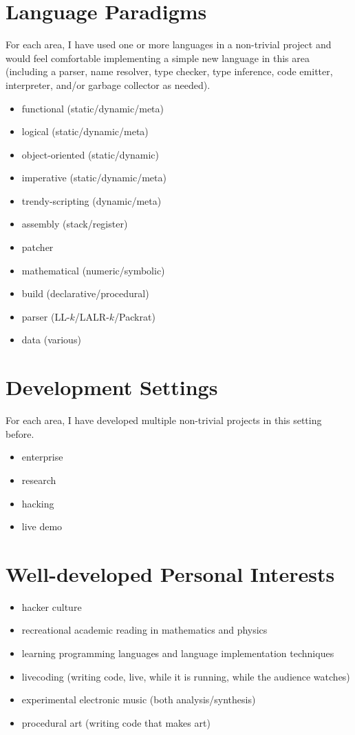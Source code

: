 \documentclass[12pt]{article}
\begin{document}
\section*{Language Paradigms}
For each area, I have used one or more languages in a non-trivial project and
would feel comfortable implementing a simple new language in this area
(including a parser, name resolver, type checker, type inference, code
emitter, interpreter, and/or garbage collector as needed).

\begin{itemize}
  \item functional (static/dynamic/meta) 
  \item logical (static/dynamic/meta)
  \item object-oriented (static/dynamic)
  \item imperative (static/dynamic/meta)
  \item trendy-scripting (dynamic/meta)
  \item assembly (stack/register)
  \item patcher
  \item mathematical (numeric/symbolic)
  \item build (declarative/procedural)
  \item parser (LL-$k$/LALR-$k$/Packrat)
  \item data (various)
\end{itemize}

\section*{Development Settings}
For each area, I have developed multiple non-trivial projects in this setting before.
\begin{itemize}
  \item enterprise
  \item research
  \item hacking
  \item live demo
\end{itemize}

\newpage
\section*{Well-developed Personal Interests}
\begin{itemize}
  \item hacker culture
  \item recreational academic reading in mathematics and physics 
  \item learning programming languages and language implementation techniques
  \item livecoding (writing code, live, while it is running, while the audience
watches)
  \item experimental electronic music (both analysis/synthesis)
  \item procedural art (writing code that makes art)
\end{itemize}
\end{document}

